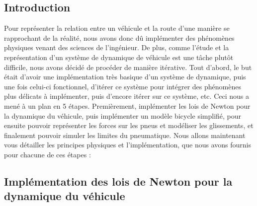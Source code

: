 \documentclass[a4paper,12pt]{report}
\begin{document}
\subsection{Introduction}
Pour représenter la relation entre un véhicule et la route d'une manière se rapprochant de la réalité, nous avons donc dû implémenter des phénomènes physiques venant des sciences de l'ingénieur. De plus, comme l'étude et la représentation d'un système  de dynamique de véhicule est une tâche plutôt difficile, nous avons décidé de procéder de manière itérative. Tout d'abord, le but était d'avoir une implémentation très basique d'un système de dynamique,  puis une fois celui-ci fonctionnel, d'itérer ce système pour intégrer des phénomènes plus délicats à implémenter, puis d'encore itérer sur ce système, etc.
Ceci nous a mené à un plan en 5 étapes.
Premièrement, implémenter les lois de Newton pour la dynamique du véhicule, puis implémenter un modèle bicycle simplifié, pour ensuite pouvoir représenter les forces sur les pneus et modéliser les glissements, et finalement pouvoir simuler les limites du pneumatique.
Nous allons maintenant vous détailler les principes physiques et l'implémentation, que nous avons fournis pour chacune de ces étapes :

\subsection{Implémentation des lois de Newton pour la dynamique du véhicule}
\end{document}
